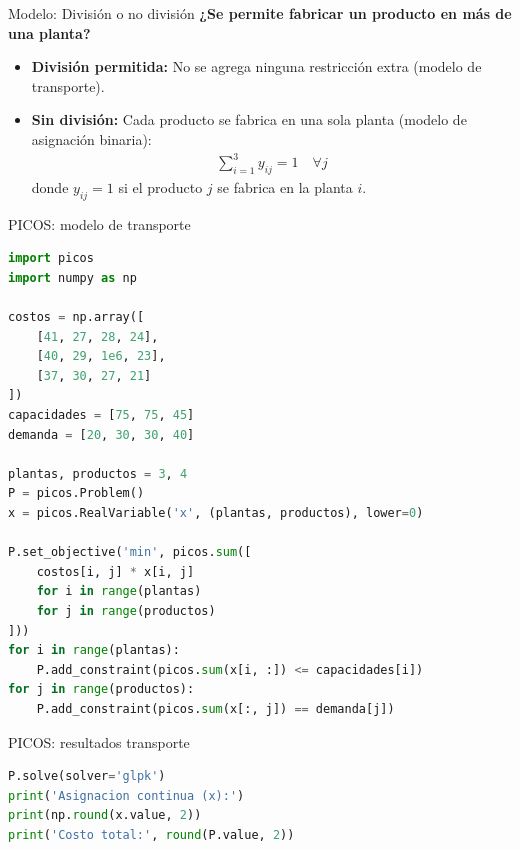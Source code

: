 \documentclass{beamer}
\begin{document}
\begin{frame}{Modelo: División o no división}
    \textbf{¿Se permite fabricar un producto en más de una planta?}
    \begin{itemize}
        \item \textbf{División permitida:} No se agrega ninguna restricción extra (modelo de transporte).
        \item \textbf{Sin división:} Cada producto se fabrica en una sola planta (modelo de asignación binaria):
        \begin{align*}
            \sum_{i=1}^{3} y_{ij} = 1 \quad \forall j
        \end{align*}
        donde $y_{ij} = 1$ si el producto $j$ se fabrica en la planta $i$.
    \end{itemize}
\end{frame}

\begin{frame}[fragile]{PICOS: modelo de transporte}
    \begin{lstlisting}[language=Python]
import picos
import numpy as np

costos = np.array([
    [41, 27, 28, 24],
    [40, 29, 1e6, 23],
    [37, 30, 27, 21]
])
capacidades = [75, 75, 45]
demanda = [20, 30, 30, 40]

plantas, productos = 3, 4
P = picos.Problem()
x = picos.RealVariable('x', (plantas, productos), lower=0)

P.set_objective('min', picos.sum([
    costos[i, j] * x[i, j]
    for i in range(plantas)
    for j in range(productos)
]))
for i in range(plantas):
    P.add_constraint(picos.sum(x[i, :]) <= capacidades[i])
for j in range(productos):
    P.add_constraint(picos.sum(x[:, j]) == demanda[j])
    \end{lstlisting}
\end{frame}

\begin{frame}[fragile]{PICOS: resultados transporte}
    \begin{lstlisting}[language=Python]
P.solve(solver='glpk')
print('Asignacion continua (x):')
print(np.round(x.value, 2))
print('Costo total:', round(P.value, 2))
    \end{lstlisting}
\end{frame}
\end{document}
